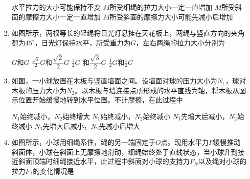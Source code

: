 \begin{enumerate}
\fourchoices
{水平拉力的大小可能保持不变}
{$ M $所受细绳的拉力大小一定一直增加}
{$ M $所受斜面的摩擦力大小一定一直增加}
{$ M $所受斜面的摩擦力大小可能先减小后增加}




\item 
{}
如图所示，两根等长的轻绳将日光灯悬挂在天花板上，两绳与竖直方向的夹角都为$ 45 ^{ \circ } $，日光灯保持水平，所受重力为$ G $，左右两绳的拉力大小分别为  
\begin{figure}[h!]
\centering

\end{figure}

\fourchoices
{$ G $和$ G $ }
{$ \frac{\sqrt{2}}{2} G $和$ \dfrac{\sqrt{2}}{2} G $}
{$ \frac{ 1 }{ 2 } G $ 和$ \dfrac{\sqrt{3}}{2} G $}
{$ \frac{ 1 }{ 2 } G $和$ \frac{ 1 }{ 2 } G $}


\item 
{}
如图，一小球放置在木板与竖直墙面之间。设墙面对球的压力大小为$ N_{1} $，球对木板的压力大小为$ N_{2} $。以木板与墙连接点所形成的水平直线为轴，将木板从图示位置开始缓慢地转到水平位置。不计摩擦，在此过程中  

\begin{minipage}[h!]{0.7\linewidth}
\vspace{0.3em}
\fourchoices
{$ N_{1} $始终减小，$ N_{2} $始终增大}
{$ N_{1} $始终减小，$ N_{2} $始终减小}
{$ N_{1} $先增大后减小，$ N_{2} $始终减小}
{$ N_{1} $先增大后减小，$ N_{2} $先减小后增大}

\vspace{0.3em}
\end{minipage}
\hfill
\begin{minipage}[h!]{0.3\linewidth}
\flushright
\vspace{0.3em}

\vspace{0.3em}
\end{minipage}


\item 
{}
如图所示，小球用细绳系住，绳的另一端固定于$ O $点。现用水平力$ F $缓慢推动斜面体，小球在斜面上无摩擦地滑动，细绳始终处于直线状态，当小球升到接近斜面顶端时细绳接近水平，此过程中斜面对小球的支持力$ F_{N} $以及绳对小球的拉力$ F_T $的变化情况是  
\begin{figure}[h!]
\centering

\end{figure}



\end{enumerate}
